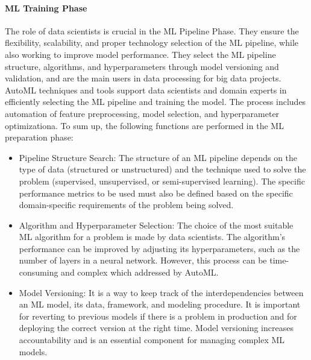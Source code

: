 \documentclass[conference]{IEEEtran}
\begin{document}
\paragraph{ML Training Phase}
The role of data scientists is crucial in the ML Pipeline Phase. They ensure the flexibility, scalability, and proper technology selection of the ML pipeline, while also working to improve model performance. They select the ML pipeline structure, algorithms, and hyperparameters through model versioning and validation, and are the main users in data processing for big data projects. AutoML techniques and tools support data scientists and domain experts in efficiently selecting the ML pipeline and training the model. The process includes automation of feature preprocessing, model selection, and hyperparameter optimizationa. To sum up, the following functions are performed in the ML preparation phase:
\begin{itemize}
	\item Pipeline Structure Search: The structure of an ML pipeline depends on the type of data (structured or unstructured) and the technique used to solve the problem (supervised, unsupervised, or semi-supervised learning). The specific performance metrics to be used must also be defined based on the specific domain-specific requirements of the problem being solved.
	\item Algorithm and Hyperparameter Selection: The choice of the most suitable ML algorithm for a problem is made by data scientists. The algorithm's performance can be improved by adjusting its hyperparameters, such as the number of layers in a neural network. However, this process can be time-consuming and complex which addressed by AutoML.
	\item Model Versioning: It is a way to keep track of the interdependencies between an ML model, its data, framework, and modeling procedure. It is important for reverting to previous models if there is a problem in production and for deploying the correct version at the right time. Model versioning increases accountability and is an essential component for managing complex ML models.
\end{itemize}
\end{document}
